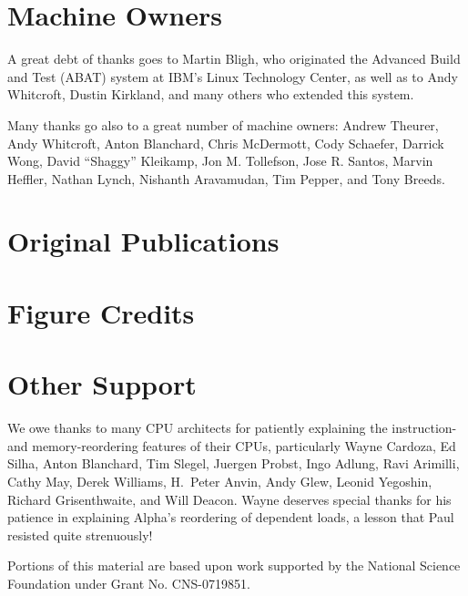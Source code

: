 \section{Machine Owners}

A great debt of thanks goes to Martin Bligh, who originated the
Advanced Build and Test (ABAT) system at IBM's Linux Technology
Center, as well as to Andy Whitcroft, Dustin Kirkland, and many
others who extended this system.

Many thanks go also to a great number of machine owners:
Andrew Theurer,
Andy Whitcroft,
Anton Blanchard,
Chris McDermott,
Cody Schaefer,
Darrick Wong,
David ``Shaggy'' Kleikamp,
Jon M. Tollefson,
Jose R. Santos,
Marvin Heffler,
Nathan Lynch,
Nishanth Aravamudan,
Tim Pepper,
and
Tony Breeds.

\section{Original Publications}

\ListOriginalPublications

\section{Figure Credits}

\ListContributions

\section{Other Support}

We owe thanks to many CPU architects for patiently explaining the
instruction- and memory-reordering features of their CPUs, particularly
Wayne Cardoza, Ed Silha, Anton Blanchard, Tim Slegel, Juergen Probst,
Ingo Adlung, Ravi Arimilli, Cathy May, Derek Williams,
H.~Peter Anvin,
Andy Glew, Leonid Yegoshin,
Richard Grisenthwaite, and Will Deacon.
Wayne deserves special thanks for his patience in explaining Alpha's reordering
of dependent loads, a lesson that Paul resisted quite strenuously!

Portions of this material are based upon work supported by the National
Science Foundation under Grant No. CNS-0719851.
